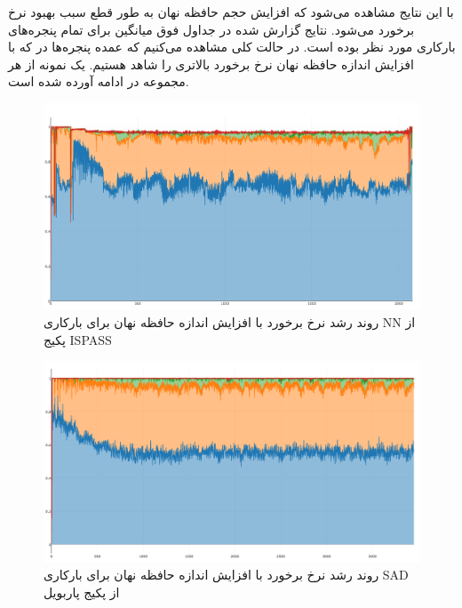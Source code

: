 \documentclass{thesis}
\begin{document}
با این نتایج مشاهده می‌شود که افزایش حجم حافظه نهان به طور قطع سبب بهبود
نرخ
برخورد
می‌شود. نتایج گزارش شده در جداول فوق میانگین برای تمام پنجره‌های بارکاری مورد
نظر بوده است. در حالت کلی مشاهده می‌کنیم که عمده پنجره‌ها در  که با افزایش
اندازه
حافظه
نهان
نرخ
برخورد بالاتری را شاهد هستیم. یک نمونه از هر مجموعه در ادامه آورده شده است.

\begin{figure}
\centering
\includegraphics[width=\textwidth]{./pics/ispass_NN_all_windows}
\caption{%
روند رشد نرخ برخورد با افزایش اندازه حافظه نهان برای بارکاری
NN
از پکیج
ISPASS
}
\end{figure}

\begin{figure}
\centering
\includegraphics[width=\textwidth]{./pics/parboil_sad_all_windows}
\caption{%
روند رشد نرخ برخورد با افزایش اندازه حافظه نهان برای بارکاری
SAD
از پکیج
پاربویل
}
\end{figure}
\end{document}
